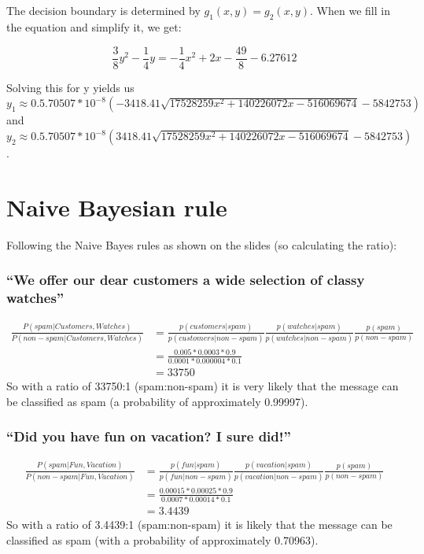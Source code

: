 \documentclass[10pt]{article}
\begin{document}
\subsection{}
The decision boundary is determined by $g_1(x,y) = g_2(x,y)$. When we fill in the equation and simplify it, we get:

\begin{equation}
\frac{3}{8}y^2 - \frac{1}{4}y = -\frac{1}{4}x^2+2x-\frac{49}{8} -6.27612
\end{equation}

Solving this for y yields us $y_1 \approx 0.5.70507*10^{-8}(-3418.41\sqrt{17528259x^2 +140226072x-516069674}-5842753)$ and $y_2 \approx 0.5.70507*10^{-8}(3418.41\sqrt{17528259x^2 +140226072x-516069674}-5842753)$.

\section{Naive Bayesian rule}
Following the Naive Bayes rules as shown on the slides (so calculating the ratio):

\subsubsection{``We offer our dear customers a wide selection of classy watches''}
\begin{align}
\frac{P(spam|Customers,Watches)}{P(non-spam|Customers,Watches)}
 & = \frac{p(customers|spam)}{p(customers|non-spam)} \frac{p(watches|spam)}{p(watches|non-spam)} \frac{p(spam)}{p(non-spam)} \\
 & = \frac{0.005*0.0003*0.9}{0.0001*0.000004*0.1} \\
 & = 33750
\end{align}
So with a ratio of 33750:1 (spam:non-spam) it is very likely that the message can be classified as spam (a probability of approximately 0.99997).

\subsubsection{``Did you have fun on vacation? I sure did!''}
\begin{align}
\frac{P(spam|Fun,Vacation)}{P(non-spam|Fun,Vacation)}
& = \frac{p(fun|spam)}{p(fun|non-spam)} \frac{p(vacation|spam)}{p(vacation|non-spam)} \frac{p(spam)}{p(non-spam)} \\
& = \frac{0.00015*0.00025*0.9}{0.0007*0.00014*0.1} \\
& = 3.4439
\end{align}
So with a ratio of 3.4439:1 (spam:non-spam) it is likely that the message can be classified as spam (with a probability of approximately 0.70963).
\end{document}
